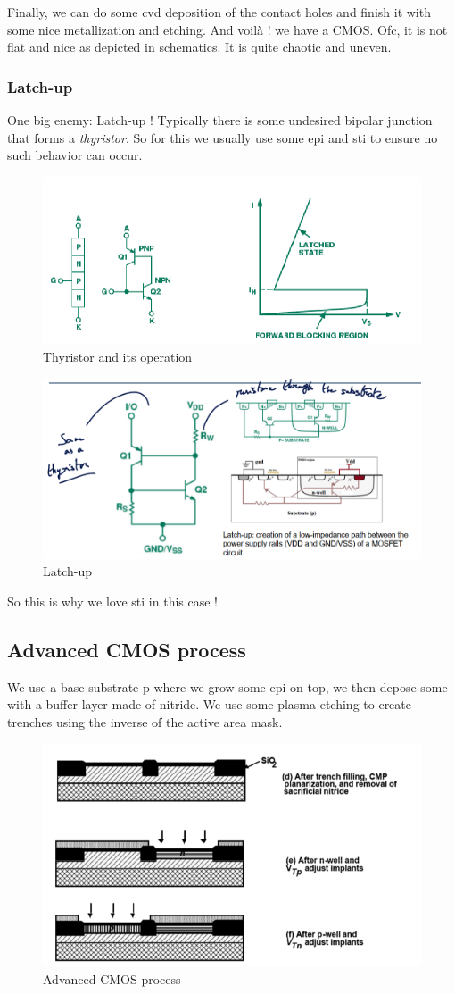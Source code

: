 \documentclass{report}
\begin{document}
Finally, we can do some \gls{cvd} deposition of the contact holes and finish it with some nice metallization and etching. And voilà ! we have a CMOS. Ofc, it is not flat and nice as depicted in schematics. It is quite chaotic and uneven.

\subsubsection{Latch-up}

One big enemy: Latch-up ! Typically there is some undesired bipolar junction that forms a \textit{thyristor}. So for this we usually use some \gls{epi} and \gls{sti} to ensure no such behavior can occur.

\begin{figure}[H]
    \centering
    \includegraphics[width=0.5\linewidth]{thyristor_operation.png}
    \caption{Thyristor and its operation}
    \label{fig:enter-label}
\end{figure}

\begin{figure}[H]
    \centering
    \includegraphics[width=0.5\linewidth]{latchup.png}
    \caption{Latch-up}
    \label{fig:enter-label}
\end{figure}

So this is why we love \gls{sti} in this case !

\subsection{Advanced CMOS process}

We use a base substrate p where we grow some \gls{epi} on top, we then depose some  with a buffer layer made of nitride. We use some plasma etching to create trenches using the inverse of the active area mask.

\begin{figure}[H]
    \centering
    \includegraphics[width=0.5\linewidth]{advanced_cmos.png}
    \caption{Advanced CMOS process}
    \label{fig:enter-label}
\end{figure}
\end{document}
